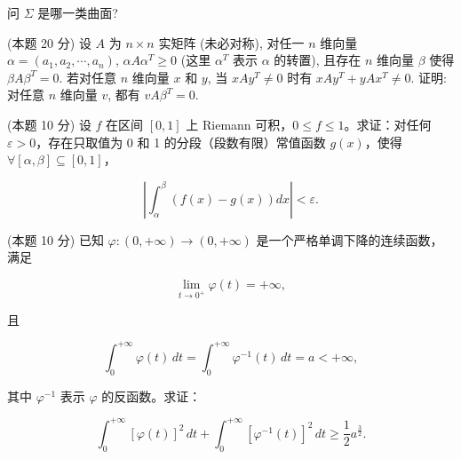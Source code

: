 \documentclass[loose]{ExBook}
\begin{document}
\begin{qitems}
\begin{bbox}
        问 \(\Sigma\) 是哪一类曲面?
    \end{bbox}

    \begin{bbox}
        \qitem (本题 20 分) 设 \(A\) 为 \(n \times n\) 实矩阵 (未必对称), 对任一 \(n\) 维向量 \(\alpha = (a_1,a_2,\cdots,a_n)\), \(\alpha A\alpha^T \geq 0\) (这里 \(\alpha^T\) 表示 \(\alpha\) 的转置), 且存在 \(n\) 维向量 \(\beta\) 使得 \(\beta A\beta^T = 0\). 若对任意 \(n\) 维向量 \(x\) 和 \(y\), 当 \(x Ay^T \neq 0\) 时有 \(x Ay^T + y Ax^T \neq 0\). 证明: 对任意 \(n\) 维向量 \(v\), 都有 \(v A \beta^T = 0\).
    \end{bbox}
    \begin{bbox}
        \qitem (本题 10 分) 设 \( f \) 在区间 \([0,1]\) 上 Riemann 可积，\( 0 \leq f \leq 1 \)。求证：对任何 \(\varepsilon > 0\)，存在只取值为 0 和 1 的分段（段数有限）常值函数 \( g(x) \)，使得 \(\forall [\alpha, \beta] \subseteq [0,1]\)，

        \[
        \left| \int_{\alpha}^{\beta} (f(x) - g(x)) dx \right| < \varepsilon.
        \]
    \end{bbox}

    \begin{bbox}
        \qitem (本题 10 分) 已知 \(\varphi : (0, +\infty) \rightarrow (0, +\infty)\) 是一个严格单调下降的连续函数，满足

        \[
        \lim\limits_{t \to 0^+} \varphi(t) = +\infty,
        \]

        且

        \[
        \int_0^{+\infty} \varphi(t) \, dt = \int_0^{+\infty} \varphi^{-1}(t) \, dt = a < +\infty,
        \]

        其中 \(\varphi^{-1}\) 表示 \(\varphi\) 的反函数。求证：

        \[
        \int_0^{+\infty} [\varphi(t)]^2 \, dt + \int_0^{+\infty} [\varphi^{-1}(t)]^2 \, dt \geq \frac{1}{2} a^{\frac{3}{2}}.
        \]
    \end{bbox}
\end{qitems}
\end{document}
